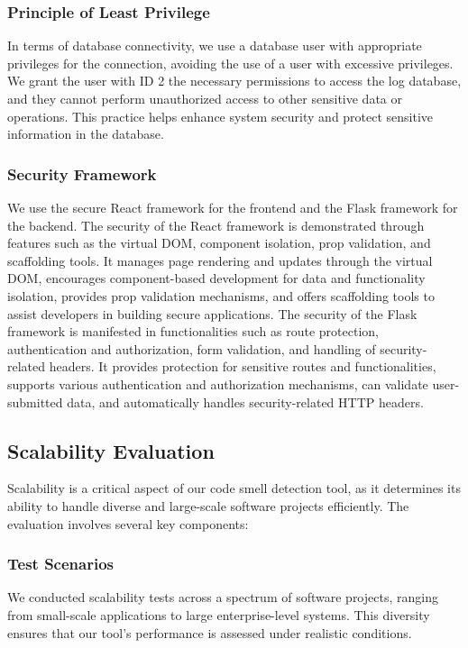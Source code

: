 \documentclass[journal]{IEEEtran}
\begin{document}
\subsubsection{Principle of Least Privilege}
In terms of database connectivity, we use a database user with appropriate privileges for the connection, avoiding the use of a user with excessive privileges. We grant the user with ID 2 the necessary permissions to access the log database, and they cannot perform unauthorized access to other sensitive data or operations. This practice helps enhance system security and protect sensitive information in the database.

\subsubsection{Security Framework}
We use the secure React framework for the frontend and the Flask framework for the backend. The security of the React framework is demonstrated through features such as the virtual DOM, component isolation, prop validation, and scaffolding tools. It manages page rendering and updates through the virtual DOM, encourages component-based development for data and functionality isolation, provides prop validation mechanisms, and offers scaffolding tools to assist developers in building secure applications.
The security of the Flask framework is manifested in functionalities such as route protection, authentication and authorization, form validation, and handling of security-related headers. It provides protection for sensitive routes and functionalities, supports various authentication and authorization mechanisms, can validate user-submitted data, and automatically handles security-related HTTP headers.

\subsection{Scalability Evaluation}
\label{evaluate:Scalability}

Scalability is a critical aspect of our code smell detection tool, as it determines its ability to handle diverse and large-scale software projects efficiently. The evaluation involves several key components:

\subsubsection{Test Scenarios}

We conducted scalability tests across a spectrum of software projects, ranging from small-scale applications to large enterprise-level systems. This diversity ensures that our tool's performance is assessed under realistic conditions.
\end{document}
